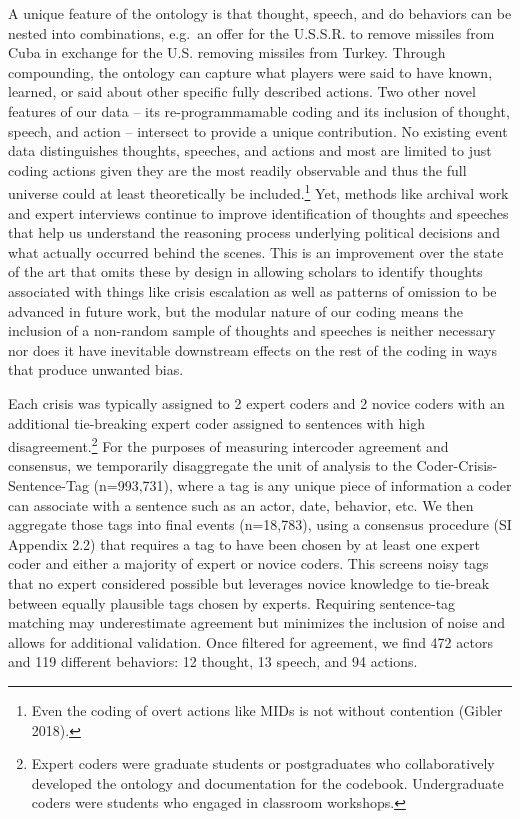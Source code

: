 \documentclass{article}
\begin{document}
A unique feature of the ontology is that thought, speech, and do
behaviors can be nested into combinations, e.g.~an offer for the
U.S.S.R. to remove missiles from Cuba in exchange for the U.S. removing
missiles from Turkey. Through compounding, the ontology can capture what
players were said to have known, learned, or said about other specific
fully described actions. Two other novel features of our data -- its
re-programmamable coding and its inclusion of thought, speech, and
action -- intersect to provide a unique contribution. No existing event
data distinguishes thoughts, speeches, and actions and most are limited
to just coding actions given they are the most readily observable and
thus the full universe could at least theoretically be
included.\footnote{Even the coding of overt actions like MIDs is not
  without contention (Gibler 2018).} Yet, methods like archival work and
expert interviews continue to improve identification of thoughts and
speeches that help us understand the reasoning process underlying
political decisions and what actually occurred behind the scenes. This
is an improvement over the state of the art that omits these by design
in allowing scholars to identify thoughts associated with things like
crisis escalation as well as patterns of omission to be advanced in
future work, but the modular nature of our coding means the inclusion of
a non-random sample of thoughts and speeches is neither necessary nor
does it have inevitable downstream effects on the rest of the coding in
ways that produce unwanted bias.

Each crisis was typically assigned to 2 expert coders and 2 novice
coders with an additional tie-breaking expert coder assigned to
sentences with high disagreement.\footnote{Expert coders were graduate
  students or postgraduates who collaboratively developed the ontology
  and documentation for the codebook. Undergraduate coders were students
  who engaged in classroom workshops.} For the purposes of measuring
intercoder agreement and consensus, we temporarily disaggregate the unit
of analysis to the Coder-Crisis-Sentence-Tag (n=993,731), where a tag is
any unique piece of information a coder can associate with a sentence
such as an actor, date, behavior, etc. We then aggregate those tags into
final events (n=18,783), using a consensus procedure (SI Appendix 2.2)
that requires a tag to have been chosen by at least one expert coder and
either a majority of expert or novice coders. This screens noisy tags
that no expert considered possible but leverages novice knowledge to
tie-break between equally plausible tags chosen by experts. Requiring
sentence-tag matching may underestimate agreement but minimizes the
inclusion of noise and allows for additional validation. Once filtered
for agreement, we find 472 actors and 119 different behaviors: 12
thought, 13 speech, and 94 actions.
\end{document}
